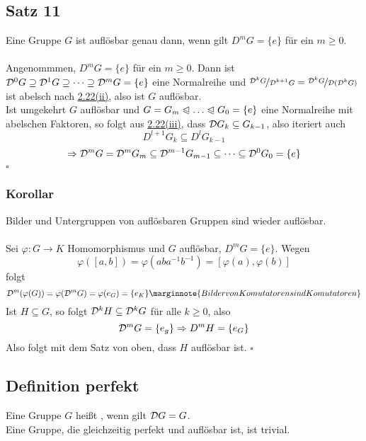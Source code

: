 \subsection{Satz 11}
\label{sub:satz_11}
Eine Gruppe $G$ ist auflösbar genau dann, wenn gilt $D^mG=\{e\}$ für ein $m\ge 0$.\\

\\
Angenommmen, $D^mG=\{e\}$ für ein $m\ge 0$. 
Dann ist $\mathcal{D}^0G\supseteq \mathcal{D}^1G\supseteq \dots\supseteq \mathcal{D}^mG=\{e\}$ eine Normalreihe und $\nicefrac{\mathcal{D}^kG}{\mathcal{D}^{k+1}G}=\nicefrac{\mathcal{D}^kG}{\mathcal{D}(\mathcal{D}^kG)}$ ist abelsch nach \hyperref[sub:komutatoren]{2.22(ii)}, also ist $G$ auflösbar.\\
Ist umgekehrt $G$ auflösbar und $G=G_m\nt\dots\nt G_0=\{e\}$ eine Normalreihe mit abelschen Faktoren, so folgt aus \hyperref[sub:komutatoren]{2.22(iii)}, dass $\mathcal{D} G_k\subseteq G_{k-1}$, also iteriert auch
\[
D^{l+1}G_k\subseteq D^lG_{k-1}
\]
\[
\Rightarrow \mathcal{D}^mG=\mathcal{D}^mG_m\subseteq \mathcal{D}^{m-1}G_{m-1}\subseteq\dots\subseteq \mathcal{D}^0G_0=\{e\}
\]
\hfill $\square$

\subsubsection*{Korollar}
Bilder und Untergruppen von auflösbaren Gruppen sind wieder auflösbar.\\

\\
Sei $\varphi:G\to K$ Homomorphismus und $G$ auflösbar, $D^mG=\{e\}$. Wegen
\[
\varphi([a,b])=\varphi(aba^{-1}b^{-1})=[\varphi(a),\varphi(b)]
\]
folgt
\[
\D^m(\varphi(G))= \varphi(\D^mG)=\varphi(e_G)=\{e_K\} \marginnote{Bilder von Komutatoren sind Komutatoren}
\]
Ist $H\subseteq G$, so folgt $\mathcal{D}^kH\subseteq \mathcal{D}^kG$ für alle $k\ge 0$, also 
\[
\mathcal{D}^mG=\{e_g\}\Rightarrow D^mH=\{e_G\}
\]
Also folgt mit dem Satz von oben, dass $H$ auflösbar ist.
\hfill $\square$

\subsection{Definition perfekt}
\label{sub:def_perfekt}
Eine Gruppe $G$ heißt , wenn gilt $\mathcal{D} G=G$.\\
Eine Gruppe, die gleichzeitig perfekt und auflösbar ist, ist trivial.

